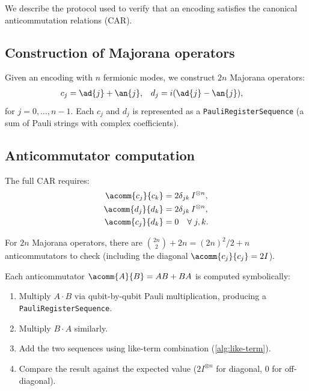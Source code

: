 
We describe the protocol used to verify that an encoding satisfies
the canonical anticommutation relations (CAR).

\subsection*{Construction of Majorana operators}

Given an encoding with $n$ fermionic modes, we construct $2n$
Majorana operators:
\begin{align}
  c_j &= \ad{j} + \an{j}, &
  d_j &= i(\ad{j} - \an{j}),
  \label{eq:majorana-construction}
\end{align}
for $j = 0, \ldots, n-1$.  Each $c_j$ and $d_j$ is represented as a
\texttt{PauliRegisterSequence} (a sum of Pauli strings with complex
coefficients).

\subsection*{Anticommutator computation}

The full CAR requires:
\begin{align}
  \acomm{c_j}{c_k} &= 2\delta_{jk}\, I^{\otimes n}, \\
  \acomm{d_j}{d_k} &= 2\delta_{jk}\, I^{\otimes n}, \\
  \acomm{c_j}{d_k} &= 0 \quad \forall\; j, k.
\end{align}

For $2n$ Majorana operators, there are $\binom{2n}{2} + 2n =
(2n)^2/2 + n$ anticommutators to check (including the diagonal
$\acomm{c_j}{c_j} = 2I$).

Each anticommutator $\acomm{A}{B} = AB + BA$ is computed symbolically:
\begin{enumerate}
  \item Multiply $A \cdot B$ via qubit-by-qubit Pauli multiplication,
    producing a \texttt{PauliRegisterSequence}.
  \item Multiply $B \cdot A$ similarly.
  \item Add the two sequences using like-term combination
    (\cref{alg:like-term}).
  \item Compare the result against the expected value ($2I^{\otimes n}$
    for diagonal, $0$ for off-diagonal).
\end{enumerate}

